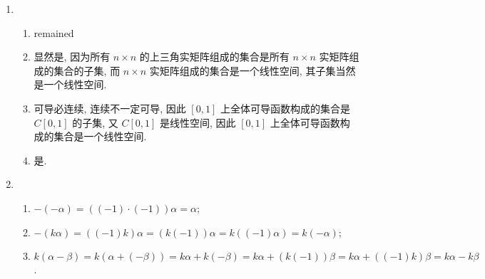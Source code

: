 % 
\begin{enumerate}
    \item %
        \begin{enumerate}[(1)]
            \item %
                {\color{red}remained}
            \item %
                显然是, 因为所有 $n\times n$ 的上三角实矩阵组成的集合是所有 $n\times n$ 实矩阵组成的集合的子集, 而 $n\times n$ 实矩阵组成的集合是一个线性空间, 其子集当然是一个线性空间.
            \item %
                可导必连续, 连续不一定可导, 因此 $[0, 1]$ 上全体可导函数构成的集合是 $C[0, 1]$ 的子集, 又 $C[0, 1]$ 是线性空间, 因此 $[0, 1]$ 上全体可导函数构成的集合是一个线性空间.
            \item %
                是.
        \end{enumerate}
    \item %
        \begin{enumerate}[(1)]
            \item %
                $-(-\alpha) = ((-1)\cdot(-1))\alpha = \alpha$;
            \item %
                $-(k\alpha) = ((-1)k)\alpha = (k(-1))\alpha = k((-1)\alpha) = k(-\alpha)$;
            \item %
                $k(\alpha-\beta) = k(\alpha+(-\beta)) = k\alpha + k(-\beta) = k\alpha + (k(-1))\beta = k\alpha + ((-1)k)\beta = k\alpha - k\beta$.
        \end{enumerate}
\end{enumerate}
% 
